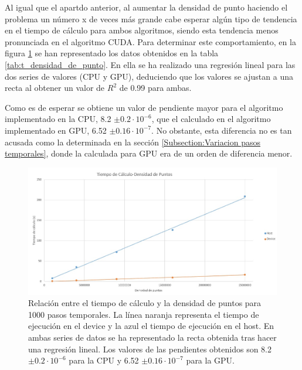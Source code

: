 \documentclass[11pt,a4paper,twoside,pdf]{article}
\numberwithin{equation}{section}
\begin{document}
Al igual que el apartdo anterior, al aumentar la densidad de punto haciendo el problema un número x de veces más grande cabe esperar algún tipo de tendencia en el tiempo de cálculo para ambos algoritmos, siendo esta tendencia menos pronunciada en el algoritmo CUDA. Para determinar este comportamiento, en la figura \ref{fig:t-densidad_de_puntos} se han representado los datos obtenidos en la tabla \ref{tab:t_densidad_de_punto}. En ella se ha realizado una regresión lineal para las dos series de valores (CPU y GPU), deduciendo que los valores se ajustan a una recta al obtener un valor de $R^2$ de 0.99 para ambas. 

Como es de esperar se obtiene un valor de pendiente mayor para el algoritmo implementado en la CPU, 8.2 $\pm 0.2 \cdot 10^{-6}$, que el calculado en el algoritmo implementado en GPU, 6.52 $\pm 0.16 \cdot 10^{-7}$. No obstante, esta diferencia no es tan acusada como la determinada en la sección \ref{Subsection:Variacion pasos temporales}, donde la calculada para GPU era de un orden de diferencia menor.


\begin{figure}[h]
\centering
\includegraphics[width=15 cm]{T-Densidad_de_Puntos.jpg}				
\caption{Relación entre el tiempo de cálculo y la densidad de puntos para 1000 pasos temporales. La línea naranja representa el tiempo de ejecución en el device y la azul el tiempo de ejecución en el host. En ambas series de datos se ha representado la recta obtenida tras hacer una regresión lineal. Los valores de las pendientes obtenidos son 8.2 $\pm 0.2 \cdot 10^{-6}$ para la CPU y 6.52 $\pm 0.16 \cdot 10^{-7}$ para la GPU.}
\label{fig:t-densidad_de_puntos}
\end{figure}
\noindent
\end{document}
